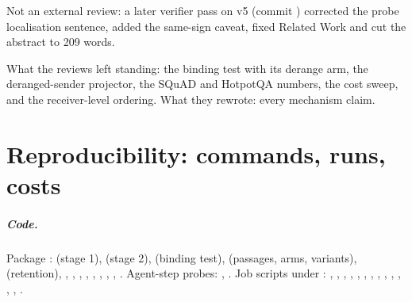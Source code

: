 \documentclass[11pt,a4paper]{report}
\begin{document}
Not an external review: a later verifier pass on v5 (commit ) corrected the probe localisation sentence, added the same-sign caveat, fixed Related Work and cut the abstract to 209 words.

What the reviews left standing: the binding test with its derange arm, the deranged-sender projector, the SQuAD and HotpotQA numbers, the cost sweep, and the receiver-level ordering. What they rewrote: every mechanism claim.

\chapter{Reproducibility: commands, runs, costs}
\label{app:repro}

\paragraph{Code.} Package :  (stage 1),  (stage 2),  (binding test),  (passages, arms, variants),  (retention), , , , , , , , , . Agent-step probes: , . Job scripts under : , , , , , , , , , , , , , .
\end{document}
